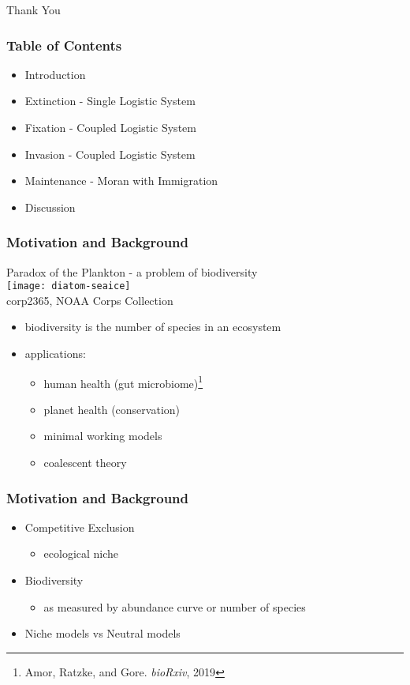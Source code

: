 \documentclass{beamer}
\begin{document}
\begin{frame}
\centering
{{\Huge Thank You}}
\end{frame}


\begin{frame}
\frametitle{Table of Contents}
\begin{itemize}
	\item Introduction
	\item Extinction - Single Logistic System%
	\item Fixation - Coupled Logistic System%
	\item Invasion - Coupled Logistic System%
	\item Maintenance - Moran with Immigration
	\item Discussion
\end{itemize}
\end{frame}


\begin{frame}
\frametitle{Motivation and Background}
\begin{center}
	Paradox of the Plankton - a problem of biodiversity \\
	\texttt{[image: diatom-seaice]} \\
	\tiny{corp2365, NOAA Corps Collection}
\end{center}
\vspace{-0.5cm}
\begin{itemize}
	\item biodiversity is the number of species in an ecosystem
	\pause
	\item applications:
	\begin{itemize}
		\item human health (gut microbiome)\footnote{Amor, Ratzke, and Gore. \emph{bioRxiv}, 2019}
		\item planet health (conservation)
		\item minimal working models
		\item coalescent theory
	\end{itemize}
\end{itemize}
\end{frame}


\begin{frame}
\frametitle{Motivation and Background}
\begin{itemize}
\item Competitive Exclusion
\begin{itemize}
	\item ecological niche
\end{itemize}
\pause
\item Biodiversity
\begin{itemize}
	\item as measured by abundance curve or number of species
\end{itemize}
\pause
\item Niche models vs Neutral models
\end{itemize}
\end{frame}
\end{document}
